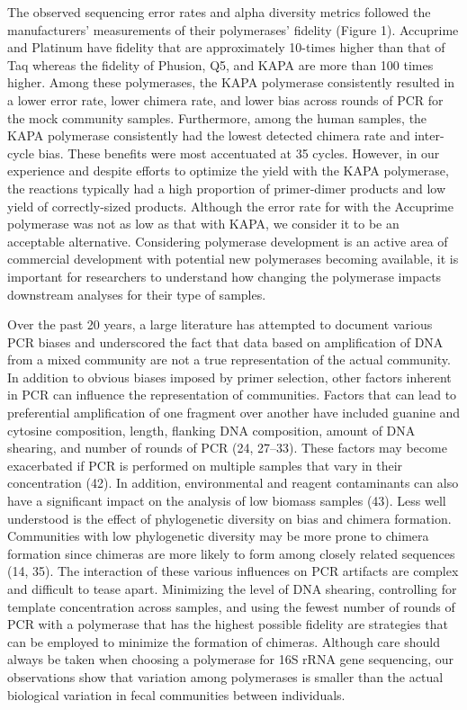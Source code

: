 \documentclass[11pt,]{article}
\begin{document}
The observed sequencing error rates and alpha diversity metrics followed
the manufacturers' measurements of their polymerases' fidelity (Figure
1). Accuprime and Platinum have fidelity that are approximately 10-times
higher than that of Taq whereas the fidelity of Phusion, Q5, and KAPA
are more than 100 times higher. Among these polymerases, the KAPA
polymerase consistently resulted in a lower error rate, lower chimera
rate, and lower bias across rounds of PCR for the mock community
samples. Furthermore, among the human samples, the KAPA polymerase
consistently had the lowest detected chimera rate and inter-cycle bias.
These benefits were most accentuated at 35 cycles. However, in our
experience and despite efforts to optimize the yield with the KAPA
polymerase, the reactions typically had a high proportion of
primer-dimer products and low yield of correctly-sized products.
Although the error rate for with the Accuprime polymerase was not as low
as that with KAPA, we consider it to be an acceptable alternative.
Considering polymerase development is an active area of commercial
development with potential new polymerases becoming available, it is
important for researchers to understand how changing the polymerase
impacts downstream analyses for their type of samples.

Over the past 20 years, a large literature has attempted to document
various PCR biases and underscored the fact that data based on
amplification of DNA from a mixed community are not a true
representation of the actual community. In addition to obvious biases
imposed by primer selection, other factors inherent in PCR can influence
the representation of communities. Factors that can lead to preferential
amplification of one fragment over another have included guanine and
cytosine composition, length, flanking DNA composition, amount of DNA
shearing, and number of rounds of PCR (24, 27--33). These factors may
become exacerbated if PCR is performed on multiple samples that vary in
their concentration (42). In addition, environmental and reagent
contaminants can also have a significant impact on the analysis of low
biomass samples (43). Less well understood is the effect of phylogenetic
diversity on bias and chimera formation. Communities with low
phylogenetic diversity may be more prone to chimera formation since
chimeras are more likely to form among closely related sequences (14,
35). The interaction of these various influences on PCR artifacts are
complex and difficult to tease apart. Minimizing the level of DNA
shearing, controlling for template concentration across samples, and
using the fewest number of rounds of PCR with a polymerase that has the
highest possible fidelity are strategies that can be employed to
minimize the formation of chimeras. Although care should always be taken
when choosing a polymerase for 16S rRNA gene sequencing, our
observations show that variation among polymerases is smaller than the
actual biological variation in fecal communities between individuals.
\end{document}
